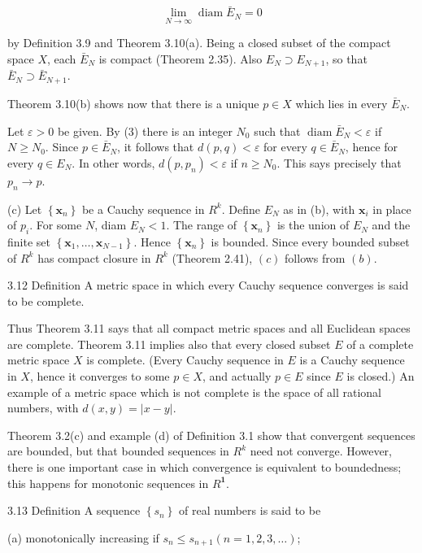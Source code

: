 \documentclass[10pt]{article}
\begin{document}
$$
\lim _{N \rightarrow \infty} \operatorname{diam} \bar{E}_{N}=0
$$

by Definition 3.9 and Theorem 3.10(a). Being a closed subset of the compact space $X$, each $\bar{E}_{N}$ is compact (Theorem 2.35). Also $E_{N} \supset E_{N+1}$, so that $\bar{E}_{N} \supset \bar{E}_{N+1}$.

Theorem 3.10(b) shows now that there is a unique $p \in X$ which lies in every $\bar{E}_{N}$.

Let $\varepsilon>0$ be given. By (3) there is an integer $N_{0}$ such that $\operatorname{diam} \bar{E}_{N}<\varepsilon$ if $N \geq N_{0}$. Since $p \in \bar{E}_{N}$, it follows that $d(p, q)<\varepsilon$ for every $q \in \bar{E}_{N}$, hence for every $q \in E_{N}$. In other words, $d\left(p, p_{n}\right)<\varepsilon$ if $n \geq N_{0}$. This says precisely that $p_{n} \rightarrow p$.

(c) Let $\left\{\mathbf{x}_{n}\right\}$ be a Cauchy sequence in $R^{k}$. Define $E_{N}$ as in (b), with $\mathbf{x}_{i}$ in place of $p_{i}$. For some $N$, diam $E_{N}<1$. The range of $\left\{\mathbf{x}_{n}\right\}$ is the union of $E_{N}$ and the finite set $\left\{\mathbf{x}_{1}, \ldots, \mathbf{x}_{N-1}\right\}$. Hence $\left\{\mathbf{x}_{n}\right\}$ is bounded. Since every bounded subset of $R^{k}$ has compact closure in $R^{k}$ (Theorem 2.41), $(c)$ follows from $(b)$.

3.12 Definition A metric space in which every Cauchy sequence converges is said to be complete.

Thus Theorem 3.11 says that all compact metric spaces and all Euclidean spaces are complete. Theorem 3.11 implies also that every closed subset $E$ of a complete metric space $X$ is complete. (Every Cauchy sequence in $E$ is a Cauchy sequence in $X$, hence it converges to some $p \in X$, and actually $p \in E$ since $E$ is closed.) An example of a metric space which is not complete is the space of all rational numbers, with $d(x, y)=|x-y|$.

Theorem 3.2(c) and example (d) of Definition 3.1 show that convergent sequences are bounded, but that bounded sequences in $R^{k}$ need not converge. However, there is one important case in which convergence is equivalent to boundedness; this happens for monotonic sequences in $R^{\mathbf{1}}$.

3.13 Definition A sequence $\left\{s_{n}\right\}$ of real numbers is said to be

(a) monotonically increasing if $s_{n} \leq s_{n+1}(n=1,2,3, \ldots)$;
\end{document}
